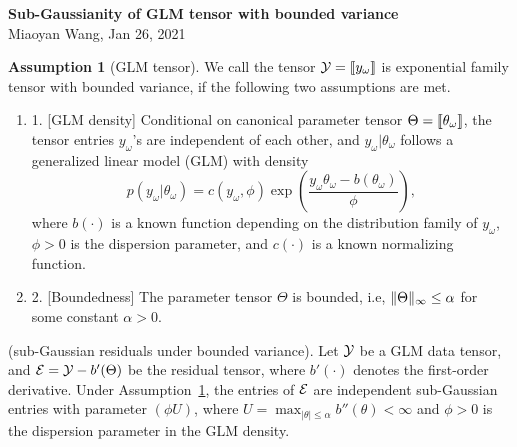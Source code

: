 \documentclass[11pt]{article}
\theoremstyle{plain}
\theoremstyle{definition}
\newtheorem{assumption}{Assumption}
\begin{document}
\begin{center}
{\bf \Large Sub-Gaussianity of GLM tensor with bounded variance}\\
Miaoyan Wang, Jan 26, 2021\\
\end{center}


\begin{assumption}[GLM tensor]\label{def:GLM}
We call the tensor $\mathcal{Y}=\llbracket y_\omega \rrbracket$ is exponential family tensor with bounded variance, if the following two assumptions are met. 
\begin{enumerate}[leftmargin=-1pt,topsep=0pt,itemsep=0ex,partopsep=0ex,parsep=0ex]
\item []1. [GLM density] Conditional on canonical parameter tensor $\Theta=\llbracket \theta_\omega \rrbracket$, the tensor entries $y_\omega$'s are independent of each other, and $y_\omega|\theta_\omega$ follows a generalized linear model (GLM) with density
\begin{equation}\label{eq:density}
p(y_\omega|\theta_\omega)=c(y_\omega,\phi)\exp\left(\frac{y_\omega \theta_\omega- b(\theta_\omega)}{\phi}\right),
\end{equation}
where $b(\cdot)$ is a known function depending on the distribution family of $y_\omega$, $\phi>0$ is the dispersion parameter, and $c(\cdot)$ is a known normalizing function.
\item []2. [Boundedness] The parameter tensor $\Theta$ is bounded, i.e, $\lVert\Theta\rVert_\infty\leq \alpha$ for some constant $\alpha>0$. 
\end{enumerate}
\end{assumption}

 (sub-Gaussian residuals under bounded variance).\label{prop}
Let $\mathcal{Y}$ be a GLM data tensor, and $\mathcal{E}=\mathcal{Y}-b'(\Theta)$ be the residual tensor, where $b'(\cdot)$ denotes the first-order derivative. Under Assumption~\ref{def:GLM}, the entries of $\mathcal{E}$ are independent sub-Gaussian entries with parameter $(\phi U)$, where $U=\max_{|\theta|\leq \alpha}b''(\theta)<\infty$ and $\phi>0$ is the dispersion parameter in the GLM density.
\end{document}
